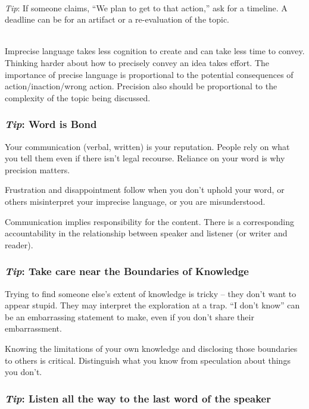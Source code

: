 \ \\
\textit{Tip}: If someone claims, ``We plan to get to that action,'' ask for a timeline. A deadline can be for an artifact or a re-evaluation of the topic.

\ \\

Imprecise language takes less cognition to create and can take less time to convey. Thinking harder about how to precisely convey an idea takes effort. 
The importance of precise language is proportional to the potential consequences of action/inaction/wrong action.
Precision also should be proportional to the complexity of the topic being discussed. 

\subsubsection*{\textit{Tip}: Word is Bond\label{sec:word-is-bond}}

Your communication (verbal, written) is your reputation. People rely on what you tell them even if there isn't legal recourse. Reliance on your word is why precision matters. 

Frustration and disappointment follow when you don't uphold your word, or others misinterpret your imprecise language, or you are misunderstood.

Communication implies responsibility for the content.  There is a corresponding accountability in the relationship between speaker and listener (or writer and reader).

\subsubsection*{\textit{Tip}: Take care near the Boundaries of Knowledge}

Trying to find someone else's extent of knowledge is tricky -- they don't want to appear stupid. They may interpret the exploration at a trap. ``I don't know'' can be an embarrassing statement to make, even if you don't share their embarrassment. 

Knowing the limitations of your own knowledge and disclosing those boundaries to others is critical. Distinguish what you know from speculation about things you don't. 

\subsubsection*{\textit{Tip}: Listen all the way to the last word of the speaker}

